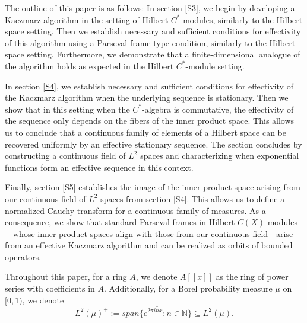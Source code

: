 \documentclass[11pt]{amsart}
\theoremstyle{definition}
\numberwithin{equation}{section}
\begin{document}
The outline of this paper is as follows: In section \ref{S3}, we begin by developing a Kaczmarz algorithm in the setting of Hilbert $C^{*}$-modules, similarly to the Hilbert space setting. Then we establish necessary and sufficient conditions for effectivity of this algorithm using a Parseval frame-type condition, similarly to the Hilbert space setting. Furthermore, we demonstrate that a finite-dimensional analogue of the algorithm holds as expected in the Hilbert $C^{*}$-module setting.

In section \ref{S4}, we establish necessary and sufficient conditions for effectivity of the Kaczmarz algorithm when the underlying sequence is stationary. Then we show that in this setting when the $C^{*}$-algebra is commutative, the effectivity of the sequence only depends on the fibers of the inner product space. This allows us to conclude that a continuous family of elements of a Hilbert space can be recovered uniformly by an effective stationary sequence. The section concludes by constructing a continuous field of $L^{2}$ spaces and characterizing when exponential functions form an effective sequence in this context.

Finally, section \ref{S5} establishes the image of the inner product space arising from our continuous field of $L^{2}$ spaces from section \ref{S4}. This allows us to define a normalized Cauchy transform for a continuous family of measures. As a consequence, we show that standard Parseval frames in Hilbert $C(X)$-modules—whose inner product spaces align with those from our continuous field—arise from an effective Kaczmarz algorithm and can be realized as orbits of bounded operators.

Throughout this paper, for a ring $A$, we denote $A[[x]]$ as the ring of power series with coefficients in $A$. Additionally, for a Borel probability measure $\mu$ on $[0,1)$, we denote $$L^{2}(\mu)^{+}:=\overline{span\{e^{2\pi i nx} : n\in \mathbb{N}\}}\subseteq L^{2}(\mu).$$
\end{document}

